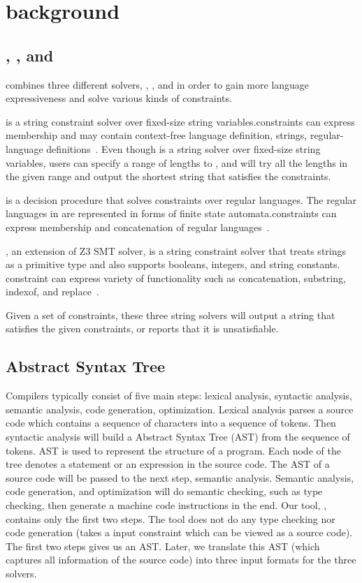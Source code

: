 \section{background}
\label{sec:background}


\subsection{\hampi, \dprle, and \zstr}
\imss combines three different solvers, \hampi, \dprle, and \zstr in order to gain more
language expressiveness and solve various kinds of constraints.

\hampi is a string constraint solver over fixed-size string variables.\hampi constraints can express
membership and may contain context-free language definition, strings, regular-language
definitions~\cite{hampi2009}. Even though \hampi is a string solver over fixed-size string variables,
users can specify a range of lengths to \hampi, and \hampi will try all the lengths in the given range
and output the shortest string that satisfies the constraints.

\dprle is a decision procedure that solves constraints over regular languages. The regular languages
in \dprle are represented in forms of finite state automata.\dprle constraints can express
membership and concatenation of regular languages~\cite{dprle2009}.

\zstr, an extension of Z3 SMT solver, is a string constraint solver that treats strings
as a primitive type and also supports booleans, integers, and string constants.
\zstr constraint can express variety of functionality such as concatenation, substring,
indexof, and replace~\cite{z32013}.

Given a set of constraints, these three string solvers will output a string that satisfies the given constraints, or reports that it is unsatisfiable.

\subsection{Abstract Syntax Tree}
Compilers typically consist of five main steps: lexical analysis, syntactic analysis, semantic
analysis, code generation, optimization. Lexical analysis parses a source code which contains
a sequence of characters into a sequence of tokens. Then syntactic analysis will build a
Abstract Syntax Tree (AST) from the sequence of tokens. AST is used to represent the structure
of a program. Each node of the tree denotes a statement or an expression in the source code.
The AST of a source code will be passed to the next step, semantic analysis.
Semantic analysis, code generation, and optimization will do semantic checking, such as type checking,
then generate a machine code instructions in the end. Our tool, \imss, contains only the first two steps.
The tool does not do any type checking nor code generation (\imss takes a input constraint which can be
viewed as a source code). The first two steps gives us an AST.
Later, we translate this AST (which captures all information of the source code) into three input formats
for the three solvers.

